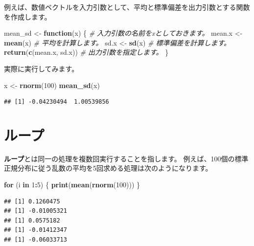 \documentclass[]{bxjsreport}
\newenvironment{Shaded}{\begin{snugshade}}{\end{snugshade}}
\newcommand{\CommentTok}[1]{\textcolor[rgb]{0.56,0.35,0.01}{\textit{#1}}}
\newcommand{\ControlFlowTok}[1]{\textcolor[rgb]{0.13,0.29,0.53}{\textbf{#1}}}
\newcommand{\DecValTok}[1]{\textcolor[rgb]{0.00,0.00,0.81}{#1}}
\newcommand{\KeywordTok}[1]{\textcolor[rgb]{0.13,0.29,0.53}{\textbf{#1}}}
\newcommand{\NormalTok}[1]{#1}
\newcommand{\OperatorTok}[1]{\textcolor[rgb]{0.81,0.36,0.00}{\textbf{#1}}}
\newcommand{\StringTok}[1]{\textcolor[rgb]{0.31,0.60,0.02}{#1}}
\let\asdf\section
\renewcommand{\section}{\chapter}
\renewcommand{\subsection}{\asdf}
\begin{document}
例えば、数値ベクトルを入力引数として、平均と標準偏差を出力引数とする関数を作成します。

\begin{Shaded}
\begin{Highlighting}[]
\NormalTok{mean_sd <-}\StringTok{ }\ControlFlowTok{function}\NormalTok{(x) \{ }\CommentTok{# 入力引数の名前をxとしておきます。}
\NormalTok{  mean.x <-}\StringTok{ }\KeywordTok{mean}\NormalTok{(x) }\CommentTok{# 平均を計算します。}
\NormalTok{  sd.x <-}\StringTok{ }\KeywordTok{sd}\NormalTok{(x) }\CommentTok{# 標準偏差を計算します。}
  \KeywordTok{return}\NormalTok{(}\KeywordTok{c}\NormalTok{(mean.x, sd.x)) }\CommentTok{# 出力引数を指定します。}
\NormalTok{\}}
\end{Highlighting}
\end{Shaded}

実際に実行してみます。

\begin{Shaded}
\begin{Highlighting}[]
\NormalTok{x <-}\StringTok{ }\KeywordTok{rnorm}\NormalTok{(}\DecValTok{100}\NormalTok{)}
\KeywordTok{mean_sd}\NormalTok{(x)}
\end{Highlighting}
\end{Shaded}

\begin{verbatim}
## [1] -0.04230494  1.00539856
\end{verbatim}

\hypertarget{ux30ebux30fcux30d7}{%
\subsection{ループ}\label{ux30ebux30fcux30d7}}

\textbf{ループ}とは同一の処理を複数回実行することを指します。
例えば、100個の標準正規分布に従う乱数の平均を5回求める処理は次のようになります。

\begin{Shaded}
\begin{Highlighting}[]
\ControlFlowTok{for}\NormalTok{ (i }\ControlFlowTok{in} \DecValTok{1}\OperatorTok{:}\DecValTok{5}\NormalTok{) \{}
  \KeywordTok{print}\NormalTok{(}\KeywordTok{mean}\NormalTok{(}\KeywordTok{rnorm}\NormalTok{(}\DecValTok{100}\NormalTok{)))}
\NormalTok{\}}
\end{Highlighting}
\end{Shaded}

\begin{verbatim}
## [1] 0.1260475
## [1] -0.01005321
## [1] 0.0575182
## [1] -0.01412347
## [1] -0.06033713
\end{verbatim}
\end{document}
